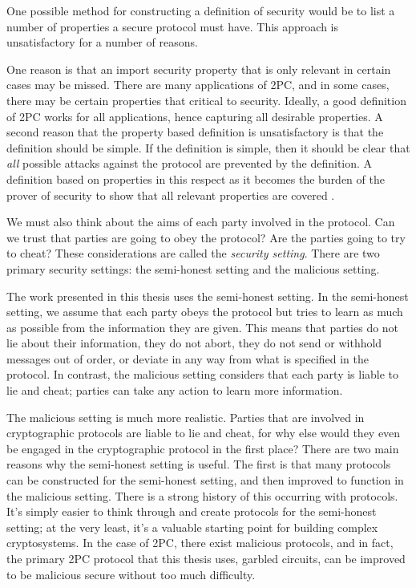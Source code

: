 One possible method for constructing a definition of security would be to list a number of properties a secure protocol must have.
This approach is unsatisfactory for a number of reasons.

One reason is that an import security property that is only relevant in certain cases may be missed.
There are many applications of 2PC, and in some cases, there may be certain properties that critical to security.
Ideally, a good definition of 2PC works for all applications, hence capturing all desirable properties.
A second reason that the property based definition is unsatisfactory is that the definition should be simple.
If the definition is simple, then it should be clear that \textit{all} possible attacks against the protocol are prevented by the definition.
A definition based on properties in this respect as it becomes the burden of the prover of security to show that all relevant properties are covered \cite{lindell2009}.

We must also think about the aims of each party involved in the protocol. 
Can we trust that parties are going to obey the protocol? 
Are the parties going to try to cheat?
These considerations are called the \textit{security setting}.
There are two primary security settings: the semi-honest setting and the malicious setting. 

The work presented in this thesis uses the semi-honest setting. 
In the semi-honest setting, we assume that each party obeys the protocol but tries to learn as much as possible from the information they are given.
This means that parties do not lie about their information, they do not abort, they do not send or withhold messages out of order, or deviate in any way from what is specified in the protocol. 
In contrast, the malicious setting considers that each party is liable to lie and cheat; parties can take any action to learn more information.

The malicious setting is much more realistic. 
Parties that are involved in cryptographic protocols are liable to lie and cheat, for why else would they even be engaged in the cryptographic protocol in the first place?
There are two main reasons why the semi-honest setting is useful.
The first is that many protocols can be constructed for the semi-honest setting, and then improved to function in the malicious setting.
There is a strong history of this occurring with protocols.
It's simply easier to think through and create protocols for the semi-honest setting; at the very least, it's a valuable starting point for building complex cryptosystems.
In the case of 2PC, there exist malicious protocols, and in fact, the primary 2PC protocol that this thesis uses, garbled circuits, can be improved to be malicious secure without too much difficulty. 

